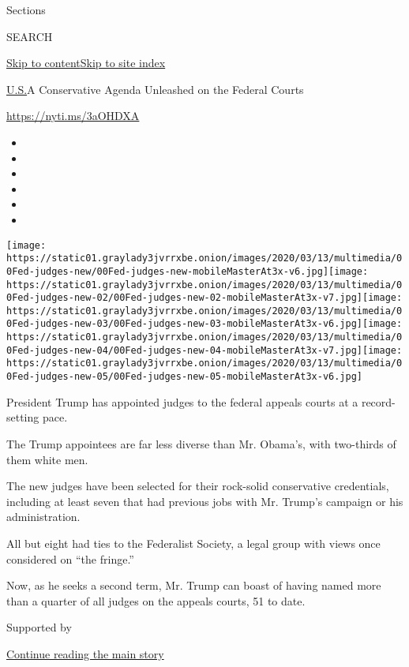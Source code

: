 Sections

SEARCH

\protect\hyperlink{site-content}{Skip to
content}\protect\hyperlink{site-index}{Skip to site index}

\href{/section/us}{U.S.}\textbar{}A Conservative Agenda Unleashed on the
Federal Courts

\url{https://nyti.ms/3aOHDXA}

\begin{itemize}
\item
\item
\item
\item
\item
\item
\end{itemize}

\texttt{[image: https://static01.graylady3jvrrxbe.onion/images/2020/03/13/multimedia/00Fed-judges-new/00Fed-judges-new-mobileMasterAt3x-v6.jpg]}\texttt{[image: https://static01.graylady3jvrrxbe.onion/images/2020/03/13/multimedia/00Fed-judges-new-02/00Fed-judges-new-02-mobileMasterAt3x-v7.jpg]}\texttt{[image: https://static01.graylady3jvrrxbe.onion/images/2020/03/13/multimedia/00Fed-judges-new-03/00Fed-judges-new-03-mobileMasterAt3x-v6.jpg]}\texttt{[image: https://static01.graylady3jvrrxbe.onion/images/2020/03/13/multimedia/00Fed-judges-new-04/00Fed-judges-new-04-mobileMasterAt3x-v7.jpg]}\texttt{[image: https://static01.graylady3jvrrxbe.onion/images/2020/03/13/multimedia/00Fed-judges-new-05/00Fed-judges-new-05-mobileMasterAt3x-v6.jpg]}

President Trump has appointed judges to the federal appeals courts at a
record-setting pace.

The Trump appointees are far less diverse than Mr. Obama's, with
two-thirds of them white men.

The new judges have been selected for their rock-solid conservative
credentials, including at least seven that had previous jobs with Mr.
Trump's campaign or his administration.

All but eight had ties to the Federalist Society, a legal group with
views once considered on ``the fringe.''

Now, as he seeks a second term, Mr. Trump can boast of having named more
than a quarter of all judges on the appeals courts, 51 to date.

Supported by

\protect\hyperlink{after-sponsor}{Continue reading the main story}

